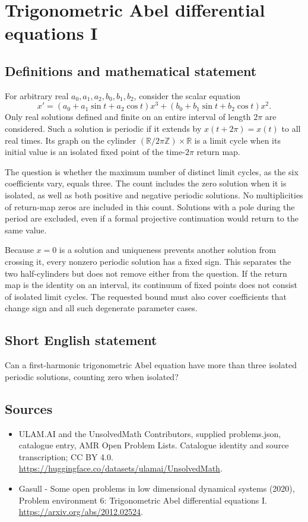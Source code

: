 \documentclass[11pt,a4paper]{article}
\begin{document}
\section*{Trigonometric Abel differential equations I}\label{statement}

\subsection{Definitions and mathematical statement}
For arbitrary real $a_0,a_1,a_2,b_0,b_1,b_2$, consider the scalar equation
\[
 x'=(a_0+a_1\sin t+a_2\cos t)x^3
       +(b_0+b_1\sin t+b_2\cos t)x^2.
\]
Only real solutions defined and finite on an entire interval of length
$2\pi$ are considered. Such a solution is periodic if it extends by
$x(t+2\pi)=x(t)$ to all real times. Its graph on the cylinder
$(\mathbb R/2\pi\mathbb Z)\times\mathbb R$ is a limit cycle when its initial
value is an isolated fixed point of the time-$2\pi$ return map.

The question is whether the maximum number of distinct limit cycles, as the
six coefficients vary, equals three. The count includes the zero solution
when it is isolated, as well as both positive and negative periodic
solutions. No multiplicities of return-map zeros are included in this count.
Solutions with a pole during the period are excluded, even if a formal
projective continuation would return to the same value.

Because $x=0$ is a solution and uniqueness prevents another solution from
crossing it, every nonzero periodic solution has a fixed sign. This separates
the two half-cylinders but does not remove either from the question. If the
return map is the identity on an interval, its continuum of fixed points
does not consist of isolated limit cycles. The requested bound must also
cover coefficients that change sign and all such degenerate parameter cases.
\subsection{Short English statement}
Can a first-harmonic trigonometric Abel equation have more than three isolated periodic solutions, counting zero when isolated?
\subsection{Sources}
\begin{itemize}
\item[S1] ULAM.AI and the UnsolvedMath Contributors, supplied problems.json, catalogue entry, AMR Open Problem Lists. Catalogue identity and source transcription; CC BY 4.0.
\url{https://huggingface.co/datasets/ulamai/UnsolvedMath}.
\item[S2] Gasull - Some open problems in low dimensional dynamical systems (2020), Problem environment 6: Trigonometric Abel differential equations I. 
\url{https://arxiv.org/abs/2012.02524}.
\end{itemize}
\end{document}

